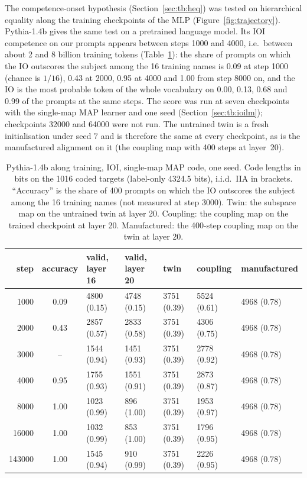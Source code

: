 \documentclass[11pt,a4paper]{article}
\begin{document}
The competence-onset hypothesis (Section~\ref{sec:tb:heq}) was tested on hierarchical equality along the training checkpoints of the MLP (Figure~\ref{fig:trajectory}). Pythia-1.4b gives the same test on a pretrained language model. Its IOI competence on our prompts appears between steps 1000 and 4000, i.e.\ between about 2 and 8 billion training tokens (Table~\ref{tab:pythia}): the share of prompts on which the IO outscores the subject among the 16 training names is 0.09 at step 1000 (chance is $1/16$), 0.43 at 2000, 0.95 at 4000 and 1.00 from step 8000 on, and the IO is the most probable token of the whole vocabulary on 0.00, 0.13, 0.68 and 0.99 of the prompts at the same steps. The score was run at seven checkpoints with the single-map MAP learner and one seed (Section~\ref{sec:tb:ioilm}); checkpoints 32000 and 64000 were not run. The untrained twin is a fresh initialisation under seed 7 and is therefore the same at every checkpoint, as is the manufactured alignment on it (the coupling map with 400 steps at layer~20).

\begin{table}[htbp]
\centering\small
\caption{Pythia-1.4b along training, IOI, single-map MAP code, one seed. Code lengths in bits on the 1016 coded targets (label-only 4324.5 bits), i.i.d.\ IIA in brackets. ``Accuracy'' is the share of 400 prompts on which the IO outscores the subject among the 16 training names (not measured at step 3000). Twin: the subspace map on the untrained twin at layer 20. Coupling: the coupling map on the trained checkpoint at layer 20. Manufactured: the 400-step coupling map on the twin at layer 20.}
\label{tab:pythia}
\begin{tabular}{rclllll}
\toprule
step & accuracy & valid, layer 16 & valid, layer 20 & twin & coupling & manufactured\\
\midrule
1000 & 0.09 & 4800 (0.15) & 4748 (0.15) & 3751 (0.39) & 5524 (0.61) & 4968 (0.78)\\
2000 & 0.43 & 2857 (0.57) & 2833 (0.58) & 3751 (0.39) & 4306 (0.75) & 4968 (0.78)\\
3000 & -- & 1544 (0.94) & 1451 (0.93) & 3751 (0.39) & 2778 (0.92) & 4968 (0.78)\\
4000 & 0.95 & 1755 (0.93) & 1551 (0.91) & 3751 (0.39) & 2873 (0.87) & 4968 (0.78)\\
8000 & 1.00 & 1023 (0.99) & 896 (1.00) & 3751 (0.39) & 1953 (0.97) & 4968 (0.78)\\
16000 & 1.00 & 1032 (0.99) & 853 (1.00) & 3751 (0.39) & 1796 (0.95) & 4968 (0.78)\\
143000 & 1.00 & 1545 (0.94) & 910 (0.99) & 3751 (0.39) & 2226 (0.95) & 4968 (0.78)\\
\bottomrule
\end{tabular}
\end{table}
\end{document}
